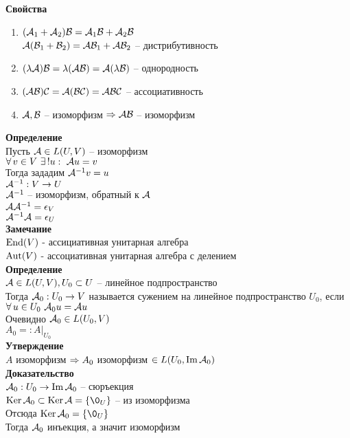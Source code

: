 \documentclass[12pt]{article}
\begin{document}
\textbf{Свойства}
\begin{enumerate}
    \item $(\mathcal{A}_1 + \mathcal{A}_2)\mathcal{B} = \mathcal{A}_1\mathcal{B} + \mathcal{A}_2\mathcal{B}$\\
    $\mathcal{A}(\mathcal{B}_1 + \mathcal{B}_2) = \mathcal{A}\mathcal{B}_1 + \mathcal{A}\mathcal{B}_2$ -- дистрибутивность
    \item $(\lambda \mathcal{A})\mathcal{B} = \lambda (\mathcal{A} \mathcal{B}) = \mathcal{A} (\lambda \mathcal{B})$ -- однородность
    \item $(\mathcal{A} \mathcal{B}) \mathcal{C} = \mathcal{A}(\mathcal{B}\mathcal{C}) = \mathcal{A}\mathcal{B}\mathcal{C}$ -- ассоциативность
    \item $\mathcal{A}, \mathcal{B}$ -- изоморфизм $\Rightarrow \mathcal{A}\mathcal{B}$ -- изоморфизм
\end{enumerate}
\textbf{Определение}\\
Пусть $\mathcal{A} \in L(U, V)$ -- изоморфизм\\
$\forall\, v \in V\ \exists\,! u:\ \mathcal{A} u = v$\\
Тогда зададим $\mathcal{A}^{-1} v = u$\\
$\mathcal{A}^{-1}: V \rightarrow U$\\
$\mathcal{A}^{-1}$ -- изоморфизм, обратный к $\mathcal{A}$\\
$\mathcal{A}\mathcal{A}^{-1} = \epsilon_V$\\
$\mathcal{A}^{-1}\mathcal{A} = \epsilon_U$\\
\textbf{Замечание}\\
$\operatorname{End}(V)$ - ассициативная унитарная алгебра\\
$\operatorname{Aut}(V)$ - ассоциативная унитарная алгебра с делением\\
\textbf{Определение}\\
$\mathcal{A} \in L(U, V), U_0 \subset U$ -- линейное подпространство\\
Тогда $\mathcal{A}_0 : U_0 \rightarrow V$ называется сужением на линейное подпространство $U_0$, если $\forall\, u \in U_0\ \mathcal{A}_0u = \mathcal{A} u$\\
Очевидно $\mathcal{A}_0 \in L(U_0, V)$\\
$A_0 =: A|_{U_0}$\\
\textbf{Утверждение}\\
$A$ изоморфизм $\Rightarrow A_0 $ изоморфизм $\in L(U_0, \operatorname{Im} \mathcal{A}_0)$\\
\textbf{Доказательство}\\
$\mathcal{A}_0: U_0 \rightarrow \operatorname{Im} \mathcal{A}_0$ -- сюръекция\\
$\ker \mcA_0 \subset \ker \mcA = \{ \0_U \}$ -- из изоморфизма\\
Отсюда $\ker \mcA_0 = \{ \0_U\}$\\
Тогда $\mathcal{A}_0$ инъекция, а значит изоморфизм\\
\end{document}
